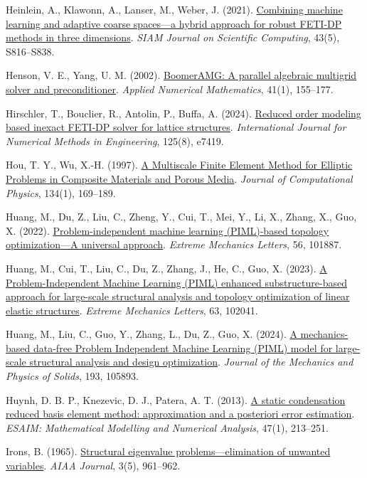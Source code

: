 \documentclass[preprint,12pt,authoryear]{elsarticle}
\begin{document}
Heinlein, A., Klawonn, A., Lanser, M., Weber, J. (2021). \href{https://doi.org/10.1137/20M1344913}{Combining machine learning and adaptive coarse spaces---a hybrid approach for robust FETI-DP methods in three dimensions}. \emph{SIAM Journal on Scientific Computing}, 43(5), S816--S838.

Henson, V. E., Yang, U. M. (2002). \href{https://doi.org/10.1016/S0168-9274(01)00115-5}{BoomerAMG: A parallel algebraic multigrid solver and preconditioner}. \emph{Applied Numerical Mathematics}, 41(1), 155--177.

Hirschler, T., Bouclier, R., Antolin, P., Buffa, A. (2024). \href{https://doi.org/10.1002/nme.7419}{Reduced order modeling based inexact FETI-DP solver for lattice structures}. \emph{International Journal for Numerical Methods in Engineering}, 125(8), e7419.

Hou, T. Y., Wu, X.-H. (1997). \href{https://doi.org/10.1006/jcph.1997.5682}{A Multiscale Finite Element Method for Elliptic Problems in Composite Materials and Porous Media}. \emph{Journal of Computational Physics}, 134(1), 169--189.

Huang, M., Du, Z., Liu, C., Zheng, Y., Cui, T., Mei, Y., Li, X., Zhang, X., Guo, X. (2022). \href{https://doi.org/10.1016/j.eml.2022.101887}{Problem-independent machine learning (PIML)-based topology optimization---A universal approach}. \emph{Extreme Mechanics Letters}, 56, 101887.

Huang, M., Cui, T., Liu, C., Du, Z., Zhang, J., He, C., Guo, X. (2023). \href{https://doi.org/10.1016/j.eml.2023.102041}{A Problem-Independent Machine Learning (PIML) enhanced substructure-based approach for large-scale structural analysis and topology optimization of linear elastic structures}. \emph{Extreme Mechanics Letters}, 63, 102041.

Huang, M., Liu, C., Guo, Y., Zhang, L., Du, Z., Guo, X. (2024). \href{https://doi.org/10.1016/j.jmps.2024.105893}{A mechanics-based data-free Problem Independent Machine Learning (PIML) model for large-scale structural analysis and design optimization}. \emph{Journal of the Mechanics and Physics of Solids}, 193, 105893.

Huynh, D. B. P., Knezevic, D. J., Patera, A. T. (2013). \href{https://doi.org/10.1051/m2an/2012022}{A static condensation reduced basis element method: approximation and a posteriori error estimation}. \emph{ESAIM: Mathematical Modelling and Numerical Analysis}, 47(1), 213--251.

Irons, B. (1965). \href{https://doi.org/10.2514/3.3027}{Structural eigenvalue problems---elimination of unwanted variables}. \emph{AIAA Journal}, 3(5), 961--962.
\end{document}
